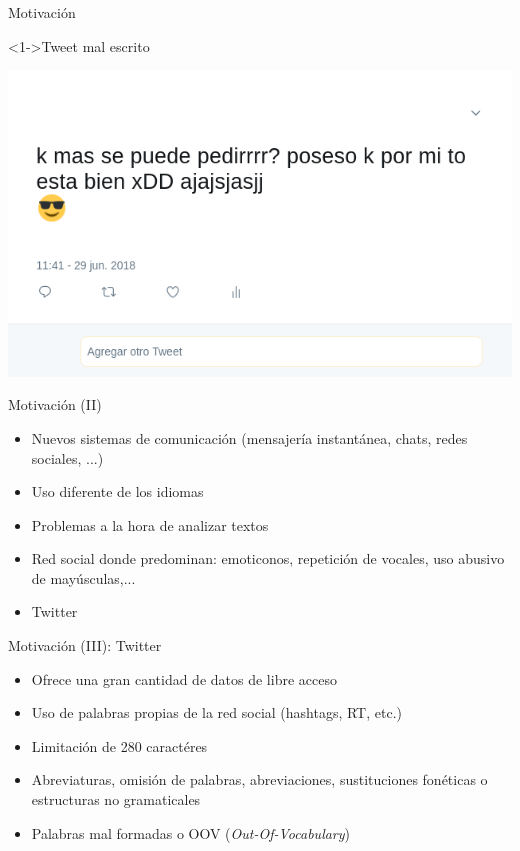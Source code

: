 \titlepageframe %

\begin{tframe}{Motivaci\'on}
	\begin{block}<1->{Tweet mal escrito}
		\begin{center}				
			\includegraphics[scale=0.4]{images/TweetBad.png}
		\end{center}
	\end{block}
\end{tframe}

\begin{tframe}{Motivaci\'on (II)}
	\begin{itemize}
		\item Nuevos sistemas de comunicaci\'on (mensajer\'ia instant\'anea, chats, redes sociales, ...)
		\item Uso diferente de los idiomas
		\item Problemas a la hora de analizar textos
		\item<+-> Red social donde predominan: emoticonos, repetici\'on de vocales, uso abusivo de may\'usculas,...
		\item<+-| alert@+> Twitter
	\end{itemize}
\end{tframe}

\begin{tframe}{Motivaci\'on (III): Twitter}
	\begin{itemize}
		\item Ofrece una gran cantidad de datos de libre acceso
		\item Uso de palabras propias de la red social (hashtags, RT, etc.)
		\item<+-> Limitaci\'on de 280 caract\'eres
		\item<+-| alert@+> Abreviaturas, omisi\'on de palabras, abreviaciones, sustituciones fon\'eticas o estructuras no gramaticales
		\item<+-| alert@+> Palabras mal formadas o OOV (\textit{Out-Of-Vocabulary})
	\end{itemize}
\end{tframe}

